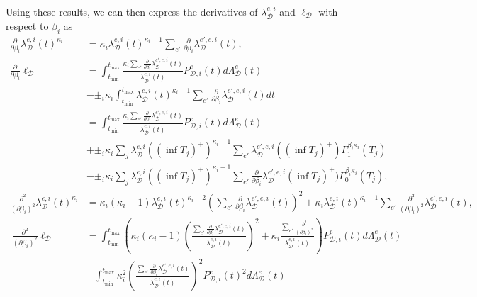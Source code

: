 \documentclass[honours,12pt]{unswthesis}
\numberwithin{equation}{section}
\begin{document}
Using these results, we can then express the derivatives of $\lambda_\mathcal{D}^{e,i}$ and $\ell_\mathcal{D}$ with respect to $\beta_i$ as
\begin{equation*}
	\begin{align}
		\frac{\partial}{\partial\beta_i} \lambda_\mathcal{D}^{e,i}(t)^{\kappa_i} &= \kappa_i \lambda_\mathcal{D}^{e,i}(t)^{\kappa_i-1} \sum_{e'} \frac{\partial}{\partial\beta_i}\lambda_\mathcal{D}^{e',e,i}(t), \\
		\frac{\partial}{\partial\beta_i}\ell_\mathcal{D} &= \int_{t_\mathrm{min}}^{t_\mathrm{max}} \frac{\kappa_i \sum_{e'} \frac{\partial}{\partial\beta_i}\lambda_\mathcal{D}^{e',e,i}(t)}{\lambda_\mathcal{D}^{e,i}(t)} P_{\mathcal{D},i}^e(t)d\Lambda_\mathcal{D}^e(t) \\
		&- \pm_i \kappa_i \int_{t_\mathrm{min}}^{t_\mathrm{max}} \lambda_\mathcal{D}^{e,i}(t)^{\kappa_i-1}\sum_{e'}\frac{\partial}{\partial\beta_i}\lambda_\mathcal{D}^{e',e,i}(t) dt \\
		&= \int_{t_\mathrm{min}}^{t_\mathrm{max}} \frac{\kappa_i \sum_{e'} \frac{\partial}{\partial\beta_i}\lambda_\mathcal{D}^{e',e,i}(t)}{\lambda_\mathcal{D}^{e,i}(t)} P_{\mathcal{D},i}^e(t)d\Lambda_\mathcal{D}^e(t) \\
		&+ \pm_i \kappa_i \sum_j \lambda_\mathcal{D}^{e,i}((\inf T_j)^+)^{\kappa_i-1}\sum_{e'} \lambda_\mathcal{D}^{e',e,i}((\inf T_j)^+)\Gamma_1^{\beta_i\kappa_i}(T_j) \\
		&- \pm_i \kappa_i \sum_j \lambda_\mathcal{D}^{e,i}((\inf T_j)^+)^{\kappa_i-1}\sum_{e'} \frac{\partial}{\partial\beta_i}\lambda_\mathcal{D}^{e',e,i}(\inf T_j)^+) \Gamma_0^{\beta_i\kappa_i}(T_j), \\
		\frac{\partial^2}{(\partial\beta_i)^2} \lambda_\mathcal{D}^{e,i}(t)^{\kappa_i} &= \kappa_i(\kappa_i-1) \lambda_\mathcal{D}^{e,i}(t)^{\kappa_i-2} \left(\sum_{e'} \frac{\partial}{\partial\beta_i}\lambda_\mathcal{D}^{e',e,i}(t)\right)^2 + \kappa_i \lambda_\mathcal{D}^{e,i}(t)^{\kappa_i-1} \sum_{e'} \frac{\partial^2}{(\partial\beta_i)^2}\lambda_\mathcal{D}^{e',e,i}(t), \\\
		\frac{\partial^2}{(\partial\beta_i)^2}\ell_\mathcal{D} &= \int_{t_\mathrm{min}}^{t_\mathrm{max}} \left( \kappa_i(\kappa_i-1)\left(\frac{\sum_{e'}\frac{\partial}{\partial\beta_i}\lambda_\mathcal{D}^{e',e,i}(t)}{\lambda_\mathcal{D}^{e,i}(t)}\right)^2 + \kappa_i \frac{\sum_{e'}\frac{\partial^2}{(\partial\beta_i)^2}}{\lambda_\mathcal{D}^{e,i}(t)} \right) P_{\mathcal{D},i}^e(t) d\Lambda_\mathcal{D}^e(t) \\
		&- \int_{t_\mathrm{min}}^{t_\mathrm{max}} \kappa_i^2\left(\frac{\sum_{e'}\frac{\partial}{\partial\beta_i}\lambda_\mathcal{D}^{e',e,i}(t)}{\lambda_\mathcal{D}^{e,i}(t)}\right)^2 P_{\mathcal{D},i}^e(t)^2 d\Lambda_\mathcal{D}^e(t) \\

\end{align}
\end{equation*}
\end{document}
